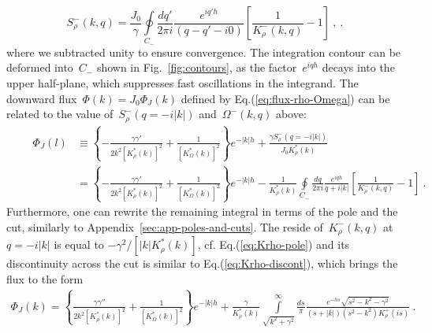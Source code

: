 \documentclass[preprint,aps,eqsecnum, prb]{revtex4-1}
\newcommand{\fplus}[1]{{#1}^{+}}
\newcommand{\fminus}[1]{{#1}^{-}}
\renewcommand{\Im}{\mathop{\mathrm{Im}}\nolimits}
\begin{document}
\begin{equation}
  \label{eq:bulk-chi-cauchy}
  \fminus{S}_\rho(k, q) = \frac{J_0}{\gamma} \oint\limits_{C_{-}}
  \frac{dq'}{2\pi i} \frac{e^{iq'h}}{(q - q' - i0)}
  \left[\frac{1}{\fminus{K}_\rho(k, q)} - 1\right]\ , 
  \ .
\end{equation}
where we subtracted unity to ensure convergence. The integration 
contour can be deformed into~$C_{-}$ shown in Fig.~\ref{fig:contours}, 
as the factor~$e^{iqh}$ decays into the upper half-plane, which suppresses
fast oscillations in the integrand. 
The downward flux~$\Phi(k) = J_0 \Phi_J(k)$ 
defined by Eq.(\ref{eq:flux-rho-Omega}) can be related
to the value of~$\fminus{S}_\rho(q = -i|k|)$ and~$\fminus{\Omega}(k, q)$
above:
\begin{align}
  \label{eq:phi-j-prev} 
\qquad \Phi_J(l) &\equiv
\left\{- \frac{\gamma \gamma'}{2k^2 \left[K_\rho^\ast(k)\right]^2}
+ \frac{1}{\left[K_\Omega^\ast(k)\right]^2} \right\} e^{-|k|h}
+ \frac{\gamma \fminus{S}_\rho(q=-i|k|)}{J_0 K_\rho^\ast(k)}
\\ \nonumber
&=\left\{- \frac{\gamma \gamma'}{2k^2 \left[K_\rho^\ast(k)\right]^2}
+ \frac{1}{\left[K_\Omega^\ast(k)\right]^2} \right\} e^{-|k|h}
- \frac{1}{K_\rho^\ast(k)} \oint\limits_{C_{-}} \frac{dq}{2\pi i} 
\frac{e^{iqh}}{q + i |k|}
\left[\frac{1}{\fminus{K}_\rho(k, q)} - 1\right]
\ .
\end{align}
Furthermore, one can rewrite the remaining integral in terms of 
the pole and the cut, similarly to Appendix~\ref{sec:app-poles-and-cuts}.
The reside of~$\fminus{K}_\rho(k, q)$ at~$q = -i|k|$ is equal to 
$-\gamma^2 / \left[|k| K_\rho^\ast(k)\right]$, cf. Eq.(\ref{eq:Krho-pole})
and its discontinuity across the cut is similar to Eq.(\ref{eq:Krho-discont}), 
which brings the flux to the form
\begin{align}
\Phi_J(k) = \left\{\frac{\gamma \gamma''}{2k^2 \left[K_\rho^\ast(k)\right]^2}
+ \frac{1}{\left[K_\Omega^\ast(k)\right]^2} \right\} e^{-|k|h}
+ \frac{\gamma}{K_\rho^\ast(k)}
   \int\limits_{\sqrt{k^2 + \gamma^2}}^{\infty} \frac{ds}{\pi}
   \frac{e^{-hs} \sqrt{s^2 - k^2 - \gamma^2}}{(s + |k|) (s^2 - k^2) \fplus{K}_\rho(is)}
\ . 
\end{align}
\end{document}
